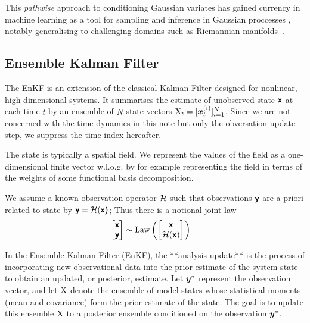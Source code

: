 \documentclass{article}
\begin{document}
This \emph{pathwise} approach to conditioning Gaussian variates has gained currency in machine learning as a tool for sampling and inference in Gaussian proccesses \citep{Wilson2020Efficiently,Wilson2021Pathwise}, notably generalising to challenging domains such as Riemannian manifolds~\citep{Borovitskiy2020Matern}.

\subsection{Ensemble Kalman Filter}

The EnKF is an extension of the classical Kalman Filter designed for nonlinear, high-dimensional systems.
It summarises the estimate of unobserved state $\boldsymbol{\mathsf{x}}$ at each time $t$ by an ensemble of $N$ state vectors $\mathrm{X}_t=[\boldsymbol{x}_{t}^{(i)}]_{i=1}^N$.
Since we are not concerned with the time dynamics in this note but only the obversation update step, we suppress the time index hereafter.

The state is typically a spatial field. We represent the values of the field as a one-dimensional finite vector w.l.o.g. by for example representing the field in terms of the weights of some functional basis decomposition.

We assume a known observation operator $\mathcal{H}$ such that observations $\boldsymbol{\mathsf{y}}$ are a priori related to state by $\boldsymbol{\mathsf{y}}=\mathcal{H}(\boldsymbol{\mathsf{x}}\boldsymbol{\mathsf{)}}$; Thus there is a notional joint law
\begin{align}
    \begin{bmatrix}
        \boldsymbol{\mathsf{x}}\\
        \boldsymbol{\mathsf{y}}
    \end{bmatrix} &\sim\operatorname{Law} \left( \begin{bmatrix}
        \boldsymbol{\mathsf{x}}\\
        \mathcal{H}(\boldsymbol{\mathsf{x}})
    \end{bmatrix}\right)
\end{align}

In the Ensemble Kalman Filter (EnKF), the **analysis update** is the process of incorporating new observational data into the prior estimate of the system state to obtain an updated, or posterior, estimate. Let \(\boldsymbol{y}^*\) represent the observation vector, and let \( \mathrm{X} \) denote the ensemble of model states whose statistical moments (mean and covariance) form the prior estimate of the state. The goal is to update this ensemble \( \mathrm{X} \) to a posterior ensemble conditioned on the observation \(\boldsymbol{y}^*\).
\end{document}
